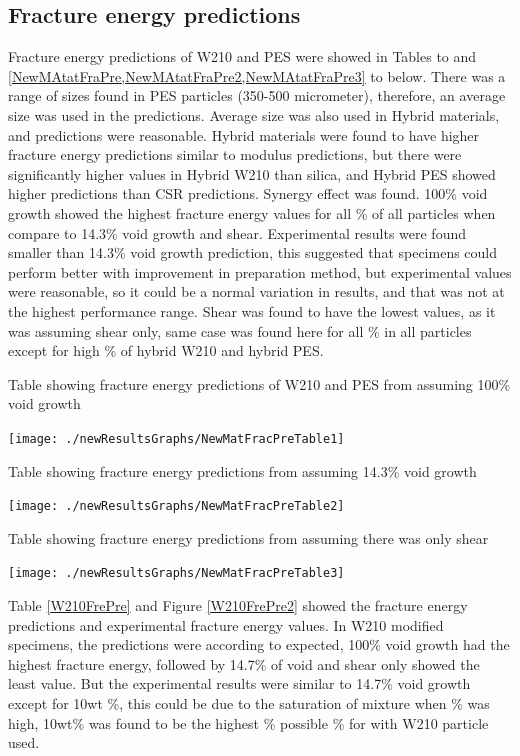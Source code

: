 \documentclass[numbers=noendperiod,chapterprefix=on]{icldt} %
\begin{document}
\subsection{Fracture energy predictions}
Fracture energy predictions of W210 and PES were showed in Tables to and  \ref{NewMAtatFraPre,NewMAtatFraPre2,NewMAtatFraPre3} to below. There was a range of sizes found in PES particles (350-500 micrometer), therefore, an average size was used in the predictions. Average size was also used in Hybrid materials, and predictions were reasonable. Hybrid materials were found to have higher fracture energy predictions similar to modulus predictions, but there were significantly higher values in Hybrid W210 than silica, and Hybrid PES showed higher predictions than CSR predictions. Synergy effect was found. 100\% void growth showed the highest fracture energy values for all \% of all particles when compare to 14.3\% void growth and shear. Experimental results were found smaller than 14.3\% void growth prediction, this suggested that specimens could perform better with improvement in preparation method, but experimental values were reasonable, so it could be a normal variation in results, and that was not at the highest performance range. Shear was found to have the lowest values, as it was assuming shear only, same case was found here for all \% in all particles except for high \% of hybrid W210 and hybrid PES. 

\begin{table}[!hp]
\centering
\caption{Table showing fracture energy predictions of W210 and PES from assuming 100\% void growth} \label{NewMAtatFraPre}
\texttt{[image: ./newResultsGraphs/NewMatFracPreTable1]}
\end{table}
\FloatBarrier

\begin{table}[!htpb]
\centering
\caption{Table showing fracture energy predictions from assuming 14.3\% void growth} \label{NewMAtatFraPre2}
\texttt{[image: ./newResultsGraphs/NewMatFracPreTable2]}
\end{table}
\FloatBarrier

\begin{table}[!htpb]
\centering
\caption{Table showing fracture energy predictions from assuming there was only shear} \label{NewMAtatFraPre3}
\texttt{[image: ./newResultsGraphs/NewMatFracPreTable3]}
\end{table}
\FloatBarrier

Table \ref{W210FrePre} and Figure \ref{W210FrePre2} showed the fracture energy predictions and experimental fracture energy values. In W210 modified specimens, the predictions were according to expected, 100\% void growth had the highest fracture energy, followed by 14.7\% of void and shear only showed the least value. But the experimental results were similar to 14.7\% void growth except for 10wt \%, this could be due to the saturation of mixture when \% was high, 10wt\% was found to be the highest \% possible \% for with W210 particle used.  
\end{document}
